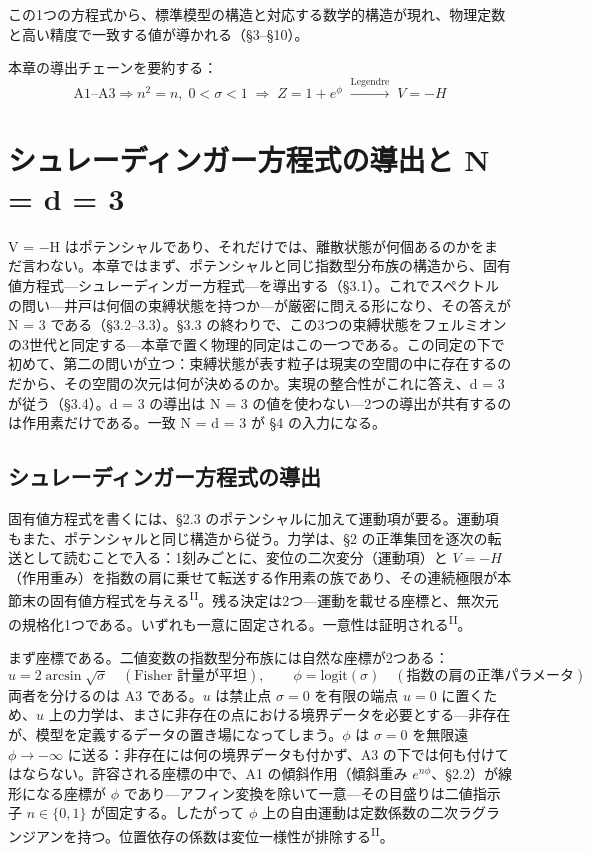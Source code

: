 \documentclass[fontsize=11pt,paper=a4,lualatex]{jlreq}
\newcommand{\PII}{\textsuperscript{\textup{II}}}
\begin{document}
この1つの方程式から、標準模型の構造と対応する数学的構造が現れ、物理定数と高い精度で一致する値が導かれる（§3--§10）。

本章の導出チェーンを要約する：
\[
  \text{A1--A3} \Rightarrow n^2{=}n,\; 0{<}\sigma{<}1 \;\Rightarrow\; Z = 1{+}e^{\phi}
  \;\xrightarrow{\text{Legendre}}\; V = -H
\]

\section{シュレーディンガー方程式の導出と N = d = 3}\label{sec:eq-two-threes}

V = −H はポテンシャルであり、それだけでは、離散状態が何個あるのかをまだ言わない。本章ではまず、ポテンシャルと同じ指数型分布族の構造から、固有値方程式---シュレーディンガー方程式---を導出する（§3.1）。これでスペクトルの問い---井戸は何個の束縛状態を持つか---が厳密に問える形になり、その答えが N = 3 である（§3.2--3.3）。§3.3 の終わりで、この3つの束縛状態をフェルミオンの3世代と同定する---本章で置く物理的同定はこの一つである。この同定の下で初めて、第二の問いが立つ：束縛状態が表す粒子は現実の空間の中に存在するのだから、その空間の次元は何が決めるのか。実現の整合性がこれに答え、d = 3 が従う（§3.4）。d = 3 の導出は N = 3 の値を使わない---2つの導出が共有するのは作用素だけである。一致 N = d = 3 が §4 の入力になる。

\subsection{シュレーディンガー方程式の導出}\label{ux30b7ux30e5ux30ecux30fcux30c7ux30a3ux30f3ux30acux30fcux65b9ux7a0bux5f0f}

固有値方程式を書くには、§2.3 のポテンシャルに加えて運動項が要る。運動項もまた、ポテンシャルと同じ構造から従う。力学は、§2 の正準集団を逐次の転送として読むことで入る：1刻みごとに、変位の二次変分（運動項）と $V = -H$（作用重み）を指数の肩に乗せて転送する作用素の族であり、その連続極限が本節末の固有値方程式を与える\PII{}。残る決定は2つ---運動を載せる座標と、無次元の規格化1つである。いずれも一意に固定される。一意性は証明される\PII{}。

まず座標である。二値変数の指数型分布族には自然な座標が2つある\cite{cencov,amari,ay}：
\[u = 2\arcsin\sqrt{\sigma}\quad(\text{Fisher 計量が平坦}),\qquad \phi = \mathrm{logit}(\sigma)\quad(\text{指数の肩の正準パラメータ})\]
両者を分けるのは A3 である。$u$ は禁止点 $\sigma = 0$ を有限の端点 $u = 0$ に置くため、$u$ 上の力学は、まさに非存在の点における境界データを必要とする---非存在が、模型を定義するデータの置き場になってしまう。$\phi$ は $\sigma = 0$ を無限遠 $\phi \to -\infty$ に送る：非存在には何の境界データも付かず、A3 の下では何も付けてはならない。許容される座標の中で、A1 の傾斜作用（傾斜重み $e^{n\phi}$、§2.2）が線形になる座標が $\phi$ であり---アフィン変換を除いて一意---その目盛りは二値指示子 $n \in \{0,1\}$ が固定する。したがって $\phi$ 上の自由運動は定数係数の二次ラグランジアンを持つ。位置依存の係数は変位一様性が排除する\PII{}。
\end{document}
